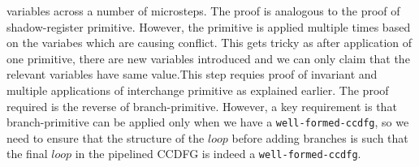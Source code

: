 variables across a number of microsteps. The proof is analogous to the proof of shadow-register primitive. However, the primitive is applied multiple times based on the variabes which are causing conflict. This gets tricky as after application of one primitive, there are new variables introduced and we can only claim that the relevant variables have same value.This step requies proof of invariant and multiple applications of interchange primitive as explained earlier. The proof required is the reverse of branch-primitive. However, a key requirement is that branch-primitive can be applied only when we have a {\tt well-formed-ccdfg}, so we need to ensure that the structure of the $loop$ before adding branches is such that the final $loop$ in the pipelined CCDFG is indeed a {\tt well-formed-ccdfg}.  

